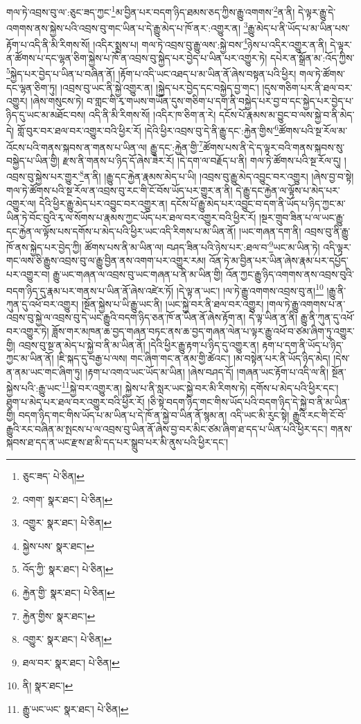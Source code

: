 གལ་ཏེ་འབྲས་བུ་ལ་:ཅུང་ཟད་ཀྱང་\footnote{ཅུང་ཟད་  པེ་ཅིན། }མ་བྱིན་པར་བདག་ཉིད་ཐམས་ཅད་ཀྱིས་རྒྱུ་འགགས་\footnote{འགག་  སྣར་ཐང་།  པེ་ཅིན། }ན་ནི། དེ་ལྟར་རྒྱུ་དེ་འགགས་ནས་སྐྱེས་པའི་འབྲས་བུ་གང་ཡིན་པ་དེ་རྒྱུ་མེད་པ་ཁོ་ནར་:འགྱུར་ན། \footnote{འགྱུར་  སྣར་ཐང་།  པེ་ཅིན། }རྒྱུ་མེད་པ་ནི་ཡོད་པ་མ་ཡིན་པས་རྟོག་པ་འདི་ནི་མི་རིགས་སོ། །འདིར་སྨྲས་པ། གལ་ཏེ་འབྲས་བུ་རྒྱུ་ལས་:སྐྱེ་བས་\footnote{སྐྱེས་པས་  སྣར་ཐང་། }ཉེས་པ་འདིར་འགྱུར་ན་ནི། དེ་ལྟར་ན་ཚོགས་པ་དང་ལྷན་ཅིག་སྐྱེས་པ་ཁོ་ན་འབྲས་བུ་སྐྱེད་པར་བྱེད་པ་ཡིན་པར་འགྱུར་ཏེ། དཔེར་ན་སྒྲོན་མ་:འོད་ཀྱིས་\footnote{འོད་ཀྱི་  སྣར་ཐང་།  པེ་ཅིན། }སྐྱེད་པར་བྱེད་པ་ཡིན་པ་བཞིན་ནོ། །རྟོག་པ་འདི་ཡང་འཐད་པ་མ་ཡིན་ནོ་ཞེས་བསྟན་པའི་ཕྱིར། གལ་ཏེ་ཚོགས་དང་ལྷན་ཅིག་ཏུ། །འབྲས་བུ་ཡང་ནི་སྐྱེ་འགྱུར་ན། །སྐྱེད་པར་བྱེད་དང་བསྐྱེད་བྱ་གང་། །དུས་གཅིག་པར་ནི་ཐལ་བར་འགྱུར། །ཞེས་གསུངས་ཏེ། བ་གླང་གི་རྭ་གཡས་གཡོན་དུས་གཅིག་པ་དག་ནི་བསྐྱེད་པར་བྱ་བ་དང་སྐྱེད་པར་བྱེད་པ་ཉིད་དུ་ཡང་མ་མཐོང་བས། འདི་ནི་མི་རིགས་སོ། །འདིར་ཁ་ཅིག་ན་རེ། དངོས་པོ་རྣམས་མ་བྱུང་བ་ལས་སྐྱེ་བ་ནི་མེད་དེ། གློ་བུར་བར་ཐལ་བར་འགྱུར་བའི་ཕྱིར་རོ། །དེའི་ཕྱིར་འབྲས་བུ་དེ་ནི་རྒྱུ་དང་:རྐྱེན་གྱིས་\footnote{རྐྱེན་གྱི་  སྣར་ཐང་།  པེ་ཅིན། }ཚོགས་པའི་སྔ་རོལ་མ་འོངས་པའི་གནས་སྐབས་ན་གནས་པ་ཡིན་ལ། རྒྱུ་དང་:རྐྱེན་གྱི་\footnote{རྐྱེན་གྱིས་  སྣར་ཐང་། }ཚོགས་པས་ནི་དེ་ད་ལྟར་བའི་གནས་སྐབས་སུ་བསྐྱེད་པ་ཡིན་གྱི། རྫས་ནི་གནས་པ་ཉིད་དོ་ཞེས་ཟེར་རོ། །དེ་དག་ལ་བརྗོད་པ་ནི། གལ་ཏེ་ཚོགས་པའི་སྔ་རོལ་དུ། །འབྲས་བུ་སྐྱེས་པར་གྱུར་\footnote{འགྱུར་  སྣར་ཐང་།  པེ་ཅིན། }ན་ནི། །རྒྱུ་དང་རྐྱེན་རྣམས་མེད་པ་ཡི། །འབྲས་བུ་རྒྱུ་མེད་འབྱུང་བར་འགྱུར། །ཞེས་བྱ་བ་སྟེ། གལ་ཏེ་ཚོགས་པའི་སྔ་རོལ་ན་འབྲས་བུ་རང་གི་ངོ་བོས་ཡོད་པར་གྱུར་ན་ནི། དེ་རྒྱུ་དང་རྐྱེན་ལ་ལྟོས་པ་མེད་པར་འགྱུར་ལ། དེའི་ཕྱིར་རྒྱུ་མེད་པར་འབྱུང་བར་འགྱུར་ན། དངོས་པོ་རྒྱུ་མེད་པར་འབྱུང་བ་དག་ནི་ཡོད་པ་ཉིད་ཀྱང་མ་ཡིན་ཏེ་བོང་བུའི་རྭ་ལ་སོགས་པ་རྣམས་ཀྱང་ཡོད་པར་ཐལ་བར་འགྱུར་བའི་ཕྱིར་རོ། །སྔར་གྲུབ་ཟིན་པ་ལ་ཡང་རྒྱུ་དང་རྐྱེན་ལ་ལྟོས་པས་དགོས་པ་མེད་པའི་ཕྱིར་ཡང་འདི་རིགས་པ་མ་ཡིན་ནོ། །ཡང་གཞན་དག་ནི། འབྲས་བུ་ནི་རྒྱུ་ཁོ་ནས་སྐྱེད་པར་བྱེད་ཀྱི། ཚོགས་པས་ནི་མ་ཡིན་ལ། བཤད་ཟིན་པའི་ཉེས་པར་:ཐལ་བ་\footnote{ཐལ་བར་  སྣར་ཐང་།  པེ་ཅིན། }ཡང་མ་ཡིན་ཏེ། འདི་ལྟར་གང་ལས་ཅི་རྒྱུས་འབྲས་བུ་ལ་རྒྱུ་བྱིན་ནས་འགག་པར་འགྱུར་རམ། འོན་ཏེ་མ་བྱིན་པར་ཡིན་ཞེས་རྣམ་པར་དཔྱོད་པར་འགྱུར་བ། རྒྱུ་ཡང་གཞན་ལ་འབྲས་བུ་ཡང་གཞན་པ་ནི་མ་ཡིན་གྱི། འོན་ཀྱང་རྒྱུ་ཉིད་འགགས་ནས་འབྲས་བུའི་བདག་ཉིད་དུ་རྣམ་པར་གནས་པ་ཡིན་ནོ་ཞེས་འཛེར་ཏོ། །དེ་ལྟ་ན་ཡང་། །ལ་ཏེ་རྒྱུ་འགགས་འབྲས་བུ་ན།\footnote{ནི།  སྣར་ཐང་། } །རྒྱུ་ནི་ཀུན་དུ་འཕོ་བར་འགྱུར། །སྔོན་སྐྱེས་པ་ཡི་རྒྱུ་ཡང་ནི། །ཡང་སྐྱེ་བར་ནི་ཐལ་བར་འགྱུར། །གལ་ཏེ་རྒྱུ་འགགས་པ་ན་འབྲས་བུ་སྐྱེ་ལ་འབྲས་བུ་དེ་ཡང་རྒྱུའི་བདག་ཉིད་ཅན་ཁོ་ན་ཡིན་ནོ་ཞེས་རྟོག་ན། དེ་ལྟ་ཡིན་ན་ནི། རྒྱུ་ནི་ཀུན་དུ་འཕོ་བར་འགྱུར་ཏེ། ཟློས་གར་མཁན་ཆ་བྱད་གཞན་བཏང་ནས་ཆ་བྱད་གཞན་ལེན་པ་ལྟར་རྒྱུ་འཕོ་བ་ཙམ་ཞིག་ཏུ་འགྱུར་གྱི། འབྲས་བུ་སྔ་ན་མེད་པ་སྐྱེ་བ་ནི་མ་ཡིན་ནོ། །དེའི་ཕྱིར་རྒྱུ་རྟག་པ་ཉིད་དུ་འགྱུར་ན། རྟག་པ་དག་ནི་ཡོད་པ་ཉིད་ཀྱང་མ་ཡིན་ནོ། །ཇི་སྐད་དུ་བརྒྱ་པ་ལས། གང་ཞིག་གང་ན་ནམ་གྱི་ཚེའང་། །མ་བསྟེན་པར་ནི་ཡོད་ཉིད་མེད། །དེས་ན་ནམ་ཡང་གང་ཞིག་ཏུ། །རྟག་པ་འགའ་ཡང་ཡོད་མ་ཡིན། །ཞེས་བཤད་དོ། །གཞན་ཡང་རྟོག་པ་འདི་ལ་ནི། སྔོན་སྐྱེས་པའི་:རྒྱུ་ཡང་\footnote{རྒྱུ་ཡང་ཡང་  སྣར་ཐང་།  པེ་ཅིན། }སྐྱེ་བར་འགྱུར་ན། སྐྱེས་པ་ནི་སླར་ཡང་སྐྱེ་བར་མི་རིགས་ཏེ། དགོས་པ་མེད་པའི་ཕྱིར་དང་། ཐུག་པ་མེད་པར་ཐལ་བར་འགྱུར་བའི་ཕྱིར་རོ། །ཅི་སྟེ་བདག་ཉིད་གང་གིས་ཡོད་པའི་བདག་ཉིད་དེ་སྐྱེ་བ་ནི་མ་ཡིན་གྱི། བདག་ཉིད་གང་གིས་ཡོད་པ་མ་ཡིན་པ་དེ་ཁོ་ན་སྐྱེ་བ་ཡིན་ནོ་སྙམ་ན། འདི་ཡང་མི་རུང་སྟེ། རྒྱུའི་རང་གི་ངོ་བོ་རྒྱུའི་རང་བཞིན་མ་སྤངས་པ་ལ་འབྲས་བུ་ཡིན་ནོ་ཞེས་བྱ་བར་མིང་ཙམ་ཞིག་ཐ་དད་པ་ཡིན་པའི་ཕྱིར་དང་། གནས་སྐབས་ཐ་དད་ན་ཡང་རྫས་ཐ་མི་དད་པར་སྒྲུབ་པར་མི་ནུས་པའི་ཕྱིར་དང་། 